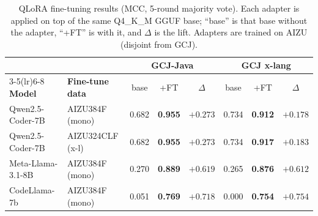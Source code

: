 \begin{table}[htbp]
  \centering
  \caption{QLoRA fine-tuning results (MCC, 5-round majority vote). Each adapter is applied on top of the same Q4\_K\_M GGUF base; ``base'' is that base without the adapter, ``+FT'' is with it, and $\Delta$ is the lift. Adapters are trained on AIZU (disjoint from GCJ).}
  \label{tab:finetune_results}
  \small
  \begin{tabular}{ll ccc ccc}
    \toprule
    & & \multicolumn{3}{c}{\textbf{GCJ-Java}} & \multicolumn{3}{c}{\textbf{GCJ x-lang}} \\
    \cmidrule(lr){3-5}\cmidrule(lr){6-8}
    \textbf{Model} & \textbf{Fine-tune data} & base & +FT & $\Delta$ & base & +FT & $\Delta$ \\
    \midrule
    Qwen2.5-Coder-7B & AIZU384F (mono) & 0.682 & \textbf{0.955} & $+0.273$ & 0.734 & \textbf{0.912} & $+0.178$ \\
    Qwen2.5-Coder-7B & AIZU324CLF (x-l) & 0.682 & \textbf{0.955} & $+0.273$ & 0.734 & \textbf{0.917} & $+0.183$ \\
    Meta-Llama-3.1-8B & AIZU384F (mono) & 0.270 & \textbf{0.889} & $+0.619$ & 0.265 & \textbf{0.876} & $+0.612$ \\
    CodeLlama-7b & AIZU384F (mono) & 0.051 & \textbf{0.769} & $+0.718$ & 0.000 & \textbf{0.754} & $+0.754$ \\
    \bottomrule
  \end{tabular}
\end{table}
